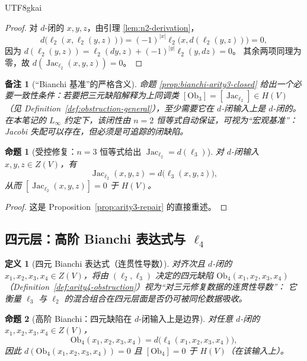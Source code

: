 \documentclass[12pt]{article}
\newtheorem{definition}{定义}[section]
\newtheorem{proposition}{命题}[section]
\newtheorem{remark}{备注}[section]
\newcommand{\Layer}{\ensuremath{\ell}}
\newcommand{\Jac}{\operatorname{Jac}}
\newcommand{\Ob}{\mathrm{Ob}}
\begin{document}
\begin{CJK*}{UTF8}{gkai}
\begin{proof}
对 $d$-闭的 $x,y,z$，由引理 \ref{lem:n2-derivation}，
\[
  d\bigl(\Layer_2(x,\Layer_2(y,z))\bigr)
  =
  (-1)^{|x|}\Layer_2\bigl(x,d(\Layer_2(y,z))\bigr)
  =
  0,
\]
因为 $d(\Layer_2(y,z))=\Layer_2(dy,z)+(-1)^{|y|}\Layer_2(y,dz)=0$。
其余两项同理为零，故 $d(\Jac_{\Layer_2}(x,y,z))=0$。
\end{proof}

\begin{remark}[“Bianchi 基准”的严格含义]
命题 \ref{prop:bianchi-arity3-closed} 给出一个必要一致性条件：若要把三元缺陷解释为上同调类
$[\Ob_3]=[\Jac_{\Layer_2}]\in H(V)$（见 Definition~\ref{def:obstruction-general}），至少需要它在 $d$-闭输入上是 $d$-闭的。
在本笔记的 $L_\infty$ 约定下，该闭性由 $n=2$ 恒等式自动保证，可视为“宏观基准”：
\emph{Jacobi 失配可以存在，但必须是可追踪的闭缺陷。}
\end{remark}

\begin{proposition}[受控修复：$n=3$ 恒等式给出 $\Jac_{\Layer_2}=d(\Layer_3)$]
\label{prop:bianchi-arity3-repair}
对 $d$-闭输入 $x,y,z\in Z(V)$，有
\[
  \Jac_{\Layer_2}(x,y,z)=d\bigl(\Layer_3(x,y,z)\bigr),
\]
从而 $[\Jac_{\Layer_2}(x,y,z)]=0$ 于 $H(V)$。
\end{proposition}

\begin{proof}
这是 Proposition~\ref{prop:arity3-repair} 的直接重述。
\end{proof}

\subsection{四元层：高阶 Bianchi 表达式与 $\Layer_4$}

\begin{definition}[四元 Bianchi 表达式（连贯性导数）]
\label{def:bianchi-arity4}
对齐次且 $d$-闭的 $x_1,x_2,x_3,x_4\in Z(V)$，将由 $(\Layer_2,\Layer_3)$ 决定的四元缺陷
$\Ob_4(x_1,x_2,x_3,x_4)$（Definition~\ref{def:arity4-obstruction}）视为“对三元修复数据的连贯性导数”：
它衡量 $\Layer_3$ 与 $\Layer_2$ 的混合组合在四元层面是否仍可被同伦数据吸收。
\end{definition}

\begin{proposition}[高阶 Bianchi：四元缺陷在 $d$-闭输入上是边界]
\label{prop:bianchi-arity4-repair}
对任意 $d$-闭的 $x_1,x_2,x_3,x_4\in Z(V)$，
\[
  \Ob_4(x_1,x_2,x_3,x_4)=d\bigl(\Layer_4(x_1,x_2,x_3,x_4)\bigr),
\]
因此 $d(\Ob_4(x_1,x_2,x_3,x_4))=0$ 且 $[\Ob_4]=0$ 于 $H(V)$（在该输入上）。
\end{proposition}


\end{CJK*}
\end{document}
